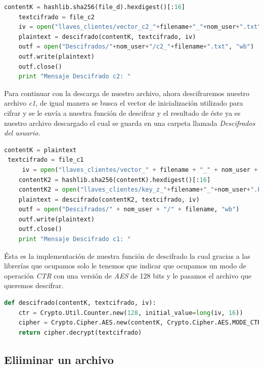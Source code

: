 \begin{lstlisting}[language=Python,frame=single, keywordstyle=\color{blue},breaklines=true, showstringspaces=false]
    contentK = hashlib.sha256(file_d).hexdigest()[:16]
    textcifrado = file_c2
    iv = open("llaves_clientes/vector_c2_"+filename+"_"+nom_user+".txt","rb").read()
    plaintext = descifrado(contentK, textcifrado, iv)
    outf = open("Descifrados/"+nom_user+"/c2_"+filename+".txt", "wb")
    outf.write(plaintext)
    outf.close()
    print "Mensaje Descifrado c2: "
\end{lstlisting}

Para continuar con la descarga de nuestro archivo, ahora descifraremos nuestro archivo \textit{c1}, de igual manera se busca el vector de inicialización utilizado para cifrar y se le envía a nuestra función de descifrar y el resultado de éste ya es nuestro archivo descargado el cual se guarda en una carpeta llamada \textit{Descifrados del usuario}.

\begin{lstlisting}[language=Python,frame=single, keywordstyle=\color{blue},breaklines=true, showstringspaces=false]
 contentK = plaintext
 textcifrado = file_c1
     iv = open("llaves_clientes/vector_" + filename + "_" + nom_user + ".txt", "rb").read()
    contentK2 = hashlib.sha256(contentK).hexdigest()[:16]
    contentK2 = open("llaves_clientes/key_z_"+filename+"_"+nom_user+".PEM", "rb").read()
    plaintext = descifrado(contentK2, textcifrado, iv)
    outf = open("Descifrados/" + nom_user + "/" + filename, "wb")
    outf.write(plaintext)
    outf.close()
    print "Mensaje Descifrado c1: "
\end{lstlisting}

Ésta es la implementación de nuestra función de descifrado la cual gracias a las librerías que ocupamos solo le tenemos que indicar que ocupamos un modo de operación \textit{CTR} con una versión de \textit{AES} de 128 bits y le pasamos el archivo que queremos descifrar.

\begin{lstlisting}[language=Python,frame=single, keywordstyle=\color{blue},breaklines=true, showstringspaces=false]
def descifrado(contentK, textcifrado, iv):
    ctr = Crypto.Util.Counter.new(128, initial_value=long(iv, 16))
    cipher = Crypto.Cipher.AES.new(contentK, Crypto.Cipher.AES.MODE_CTR, counter=ctr)
    return cipher.decrypt(textcifrado)
\end{lstlisting}

\subsection{Eliiminar un archivo}

